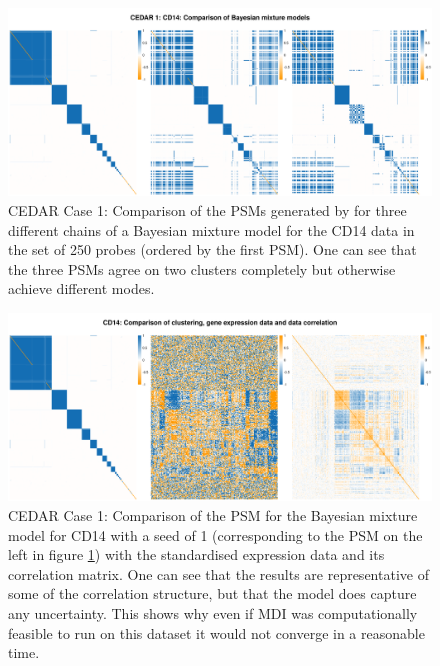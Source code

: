 \documentclass[14pt]{extarticle} %
\begin{document}
	\begin{figure} %
		\centering
		\includegraphics[scale=0.5]{Images/Biology_data/Set_250/Bayesian_mixture_models/CD14_comparison_across_seeds.png}
		\caption{CEDAR Case 1: Comparison of the PSMs generated by for three different chains of a Bayesian mixture model for the CD14 data in the set of 250 probes (ordered by the first PSM). One can see that the three PSMs agree on two clusters completely but otherwise achieve different modes.}
		\label{fig:results:cedar_1:cd14_bayes_mixture_model_comp}
	\end{figure}

	\begin{figure} %
		\centering
		\includegraphics[scale=0.45]{Images/Biology_data/Set_250/Bayesian_mixture_models/Comparison_expression_clustering_correlation/CD14.png}
		\caption{CEDAR Case 1: Comparison of the PSM for the Bayesian mixture model for CD14 with a seed of 1 (corresponding to the PSM on the left in figure \ref{fig:results:cedar_1:cd14_bayes_mixture_model_comp}) with the standardised expression data and its correlation matrix. One can see that the results are representative of some of the correlation structure, but that the model does capture any uncertainty. This shows why even if MDI was computationally feasible to run on this dataset it would not converge in a reasonable time.}
		\label{fig:results:cedar_1:cd14_bayes_mixture_model_comp_seed_1}
	\end{figure}
	
\end{document}
